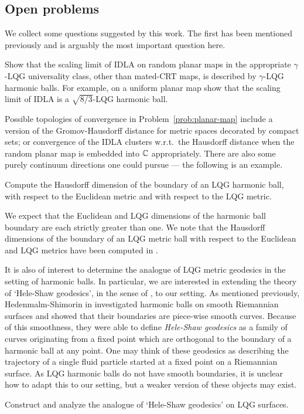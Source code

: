 \documentclass[12pt]{amsart}
\numberwithin{equation}{section}
\begin{document}
	
	\subsection{Open problems} \label{subsec:open-problems}
	We collect some questions suggested by this work. The first has been mentioned previously
	and is arguably the most important question here. 
	\begin{problem} \label{prob:planar-map}
		Show that the scaling limit of IDLA on random planar maps in the appropriate $\gamma$-LQG universality class, other than mated-CRT maps, is described by $\gamma$-LQG harmonic balls.
		For example, on a uniform planar map show that the scaling limit of IDLA is a $\sqrt{8/3}$-LQG harmonic ball.
	\end{problem}
	
	Possible topologies of convergence in Problem~\ref{prob:planar-map} include a version of the Gromov-Hausdorff distance for metric spaces decorated by compact sets; or convergence of the IDLA clusters w.r.t.\ the Hausdorff distance when the random planar map is embedded into $\mathbb{C}$ appropriately.
	There are also some purely continuum directions one could pursue --- the following is an example.
	
	
	\begin{problem} \label{prob:boundary-dim}
		Compute the Hausdorff dimension of the boundary of an LQG harmonic ball, with respect to the Euclidean metric and with respect to the LQG metric.
	\end{problem}
	
	We expect that the Euclidean and LQG dimensions of the harmonic ball boundary are each strictly greater than one. We note that the Hausdorff dimensions of the boundary of an LQG metric ball with respect to the Euclidean and LQG metrics have been computed in \cite{gwynne-dimension-metric-ball, MR4408506}. 
	
	It is also of interest to determine the analogue of LQG metric geodesics in 
	the setting of harmonic balls. In particular, we are interested in extending the theory of `Hele-Shaw geodesics', in the sense of 
	\cite{hedenmalm2002hele}, to our setting. As mentioned previously, Hedenmalm-Shimorin in \cite{hedenmalm2002hele} investigated harmonic balls on smooth Riemannian surfaces
	and showed that their boundaries are piece-wise smooth curves. Because of this smoothness, they were able to define
	{\it Hele-Shaw geodesics} as a family of curves originating from a fixed point which are orthogonal to the boundary of a harmonic ball at any point. 
	One may think of these geodesics as describing the trajectory of a single fluid particle started at a fixed point on a Riemannian surface. 
	As LQG harmonic balls do not have smooth boundaries, it is unclear how to adapt this to our setting, but 
	a weaker version of these objects may exist. 
	\begin{problem}
		Construct and analyze the analogue of `Hele-Shaw geodesics' \cite{hedenmalm2002hele} on LQG surfaces. 
	\end{problem}
	
\end{document}
